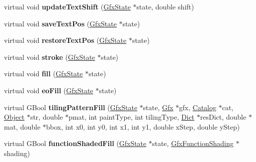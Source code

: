 \begin{DoxyCompactItemize}
virtual void {\bfseries update\+Text\+Shift} (\hyperlink{class_gfx_state}{Gfx\+State} $\ast$state, double shift)
\item 
\mbox{\label{class_p_s_output_dev_abe7574402684319167b01d19c6f87ad8}} 
virtual void {\bfseries save\+Text\+Pos} (\hyperlink{class_gfx_state}{Gfx\+State} $\ast$state)
\item 
\mbox{\label{class_p_s_output_dev_afce9cf45109d92a01d95d16d20272315}} 
virtual void {\bfseries restore\+Text\+Pos} (\hyperlink{class_gfx_state}{Gfx\+State} $\ast$state)
\item 
\mbox{\label{class_p_s_output_dev_acefd07190e541fd5f0be48f7783495dc}} 
virtual void {\bfseries stroke} (\hyperlink{class_gfx_state}{Gfx\+State} $\ast$state)
\item 
\mbox{\label{class_p_s_output_dev_ad3a727f7ba86c44d8d7c43fe17675589}} 
virtual void {\bfseries fill} (\hyperlink{class_gfx_state}{Gfx\+State} $\ast$state)
\item 
\mbox{\label{class_p_s_output_dev_a8e45691a55af75bafe51765e8419e8d2}} 
virtual void {\bfseries eo\+Fill} (\hyperlink{class_gfx_state}{Gfx\+State} $\ast$state)
\item 
\mbox{\label{class_p_s_output_dev_a19acb4f7dd9d5eddc853e4a4db9c63a3}} 
virtual G\+Bool {\bfseries tiling\+Pattern\+Fill} (\hyperlink{class_gfx_state}{Gfx\+State} $\ast$state, \hyperlink{class_gfx}{Gfx} $\ast$gfx, \hyperlink{class_catalog}{Catalog} $\ast$cat, \hyperlink{class_object}{Object} $\ast$str, double $\ast$pmat, int paint\+Type, int tiling\+Type, \hyperlink{class_dict}{Dict} $\ast$res\+Dict, double $\ast$mat, double $\ast$bbox, int x0, int y0, int x1, int y1, double x\+Step, double y\+Step)
\item 
\mbox{\label{class_p_s_output_dev_a0a1e1f1522bb1f3e86e74b45cce7ebb7}} 
virtual G\+Bool {\bfseries function\+Shaded\+Fill} (\hyperlink{class_gfx_state}{Gfx\+State} $\ast$state, \hyperlink{class_gfx_function_shading}{Gfx\+Function\+Shading} $\ast$shading)
\item 
\mbox{\label{class_p_s_output_dev_a3e135a27c36c7d210b85ef05a1738bd7}} 

\end{DoxyCompactItemize}

